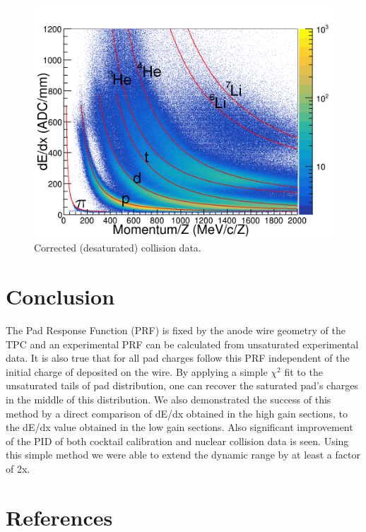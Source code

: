 \documentclass[review]{elsarticle}
\begin{document}
\begin{figure}[H]
\includegraphics[width=\linewidth]{data_desat}
\caption{Corrected (desaturated) collision data.}
\label{fig:data_desat}
\end{figure}


\section{Conclusion}
The Pad Response Function (PRF) is fixed by the anode wire geometry of the TPC and an experimental PRF can be calculated from unsaturated experimental data. It is also true that for all pad charges follow this PRF independent of the initial charge of deposited on the wire. By applying a simple $\chi^2$ fit to the unsaturated tails of pad distribution, one can recover the saturated pad's charges in the middle of this distribution. We also demonstrated the success of this method by a direct comparison of dE/dx obtained in the high gain sections, to the dE/dx value obtained in the low gain sections. Also significant improvement of the PID of both cocktail calibration and nuclear collision data is seen. Using this simple method we were able to extend the dynamic range by at least a factor of 2x. 
\section*{References}


\end{document}
